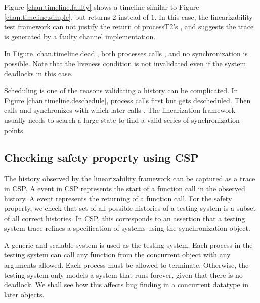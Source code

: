 \documentclass[a4paper, 12pt]{article}
\begin{document}

Figure \ref{chan.timeline.faulty} shows a timeline similar to Figure \ref{chan.timeline.simple}, but  returns $2$ instead of $1$. In this case, the linearizability test framework can not justify the return of process{T2}'s , and suggests the trace is generated by a faulty channel implementation. 

In Figure \ref{chan.timeline.dead}, both processes calls , and no synchronization is possible. Note that the liveness condition is not invalidated even if the system deadlocks in this case.

Scheduling is one of the reasons validating a history can be complicated. In Figure \ref{chan.timeline.deschedule}, process  calls  first but gets descheduled. Then  calls  and synchronizes with  which later calls . The linearization framework usually needs to search a large state to find a valid series of synchronization points. 

\subsection{Checking safety property using CSP} 
The history observed by the linearizability framework can be captured as a trace in CSP. A  event in CSP represents the start of a function call in the observed history. A  event represents the returning of a function call. For the safety property, we check that set of all possible histories of a testing system is a subset of all correct histories. In CSP, this corresponds to an assertion that a testing system trace refines a specification of systems using the synchronization object. 

A generic and scalable system is used as the testing system. Each process in the testing system can call any function from the concurrent object with any arguments allowed. Each process must be allowed to terminate. Otherwise, the testing system only models a system that runs forever, given that there is no deadlock. We shall see how this affects bug finding in a concurrent datatype in later objects.
\end{document}
